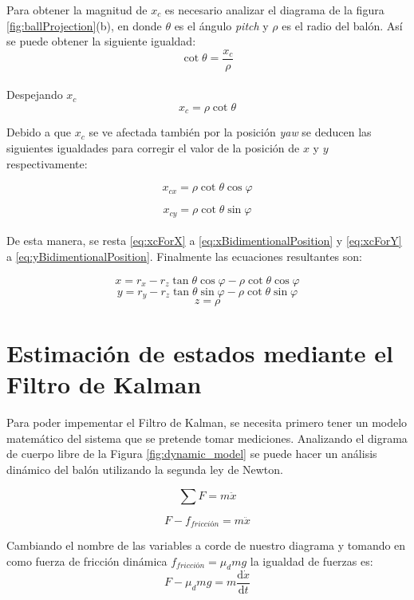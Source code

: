 Para obtener la magnitud de $x_c$ es necesario analizar el diagrama de la figura \ref{fig:ballProjection}(b), en donde $\theta$ es el ángulo \textit{pitch} y $\rho$ es el radio del balón. Así se puede obtener la siguiente igualdad:
\[\cot{\theta} = \frac{x_c}{\rho}\]\\

Despejando $x_c$
\[x_c = \rho \cot{\theta}\]

Debido a que $x_c$ se ve afectada también por la posición \textit{yaw} se deducen las siguientes igualdades para corregir el valor de la posición de $x$ y $y$ respectivamente:

\begin{equation}
\label{eq:xcForX}
x_{cx} = \rho \cot{\theta} \cos{\varphi}
\end{equation}

\begin{equation}
\label{eq:xcForY}
x_{cy} = \rho \cot{\theta} \sin{\varphi}
\end{equation}\\

De esta manera, se resta \ref{eq:xcForX}  a \ref{eq:xBidimentionalPosition} y \ref{eq:xcForY} a \ref{eq:yBidimentionalPosition}. Finalmente las ecuaciones resultantes son:

\[x = r_x - r_z \tan{\theta} \cos{\varphi} - \rho \cot{\theta} \cos{\varphi}\]
\[y = r_y - r_z \tan{\theta} \sin{\varphi} - \rho \cot{\theta} \sin{\varphi}\]
\[z = \rho \]


		
	\section[Estimación mediante EKF]{Estimación de estados mediante el Filtro de Kalman}
	Para poder impementar el Filtro de Kalman, se necesita primero tener un modelo matemático del sistema que se pretende tomar mediciones. Analizando el digrama de cuerpo libre de la Figura \ref{fig:dynamic_model} se puede hacer un análisis dinámico del balón utilizando la segunda ley de Newton.

\begin{equation}
\sum F = m \ddot{x}
\label{eq:second_law}
\end{equation}

\begin{equation}
F-f_{fricción} = m \ddot{x}
\label{eq:equivalency_1}
\end{equation}

Cambiando el nombre de las variables a corde de nuestro diagrama y tomando en como fuerza de fricción dinámica $f_{fricción} = \mu_d m g $ la igualdad de fuerzas es:
\begin{equation}
F- \mu_d m g = m  \frac{\mathrm{d} \dot{x}}{\mathrm{d} t}
\label{eq:equivalency_2}
\end{equation}
	
